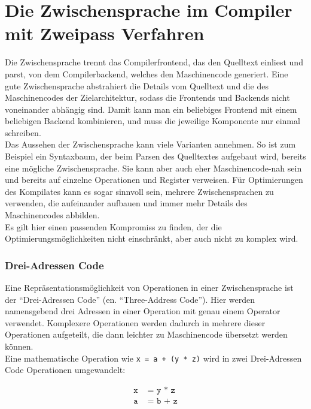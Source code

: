\chapter{Die Zwischensprache im Compiler mit Zweipass Verfahren}
\label{chap:theory:inBetweenLayer}

Die Zwischensprache trennt das Compilerfrontend, das den Quelltext einliest und parst, von dem Compilerbackend, welches den Maschinencode generiert.
Eine gute Zwischensprache abstrahiert die Details vom Quelltext und die des Maschinencodes der Zielarchitektur, sodass die Frontends und Backends nicht voneinander abhängig sind.
Damit kann man ein beliebiges Frontend mit einem beliebigen Backend kombinieren, und muss die jeweilige Komponente nur einmal schreiben.\\
Das Aussehen der Zwischensprache kann viele Varianten annehmen.
So ist zum Beispiel ein Syntaxbaum, der beim Parsen des Quelltextes aufgebaut wird, bereits eine mögliche Zwischensprache.
Sie kann aber auch eher Maschinencode-nah sein und bereits auf einzelne Operationen und Register verweisen.
Für Optimierungen des Kompilates kann es sogar sinnvoll sein, mehrere Zwischensprachen zu verwenden, die aufeinander aufbauen und immer mehr Details des Maschinencodes abbilden.\\
Es gilt hier einen passenden Kompromiss zu finden, der die Optimierungsmöglichkeiten nicht einschränkt, aber auch nicht zu komplex wird.\\

\subsection{Drei-Adressen Code}

Eine Repräsentationsmöglichkeit von Operationen in einer Zwischensprache ist der ``Drei-Adressen Code'' (en. ``Three-Address Code'').
Hier werden namensgebend drei Adressen in einer Operation mit genau einem Operator verwendet\cite{aho:2006}.
Komplexere Operationen werden dadurch in mehrere dieser Operationen aufgeteilt, die dann leichter zu Maschinencode übersetzt werden können.\\
Eine mathematische Operation wie \texttt{x = a + (y * z)} wird in zwei Drei-Adressen Code Operationen umgewandelt:
\begin{figure}[H]
  \begin{align*}
    \texttt{x} &\texttt{\ = y * z}\\
    \texttt{a} &\texttt{\ = b + z}
  \end{align*}
\end{figure}


